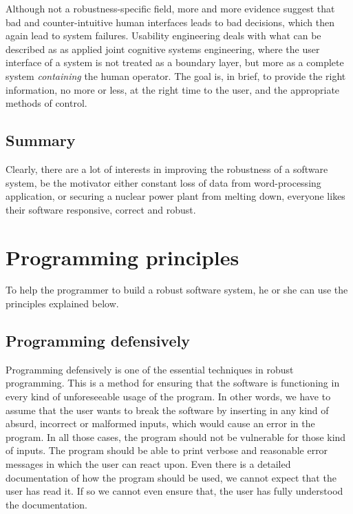 \documentclass[10pt,a4paper]{article}
\begin{document}
Although not a robustness-specific field, more and more evidence suggest that bad and counter-intuitive human interfaces leads to bad decisions, which then again lead to system failures.
Usability engineering deals with what can be described as as applied joint cognitive systems\cite{hollnagel2005joint} engineering, where the user interface of a system is not treated as a boundary layer, but more as a complete system \emph{containing} the human operator.
The goal is, in brief, to provide the right information, no more or less, at the right time to the user, and the appropriate methods of control.

\subsection{Summary}
Clearly, there are a lot of interests in improving the robustness of a software system, be the motivator either constant loss of data from word-processing application, or securing a nuclear power plant from melting down, everyone likes their software responsive, correct and robust.

\section{Programming principles}
\label{sec:programming_principles}

To help the programmer to build a robust software system, he or she can use the principles explained below.

\subsection{Programming defensively}

Programming defensively is one of the essential techniques in robust programming.
This is a method for ensuring that the software is functioning in every kind of unforeseeable usage of the program. In other words, we have to assume that the user wants to break the software by inserting in any kind of absurd, incorrect or malformed inputs, which would cause an error in the program. In all those cases, the program should not be vulnerable for those kind of inputs. The program should be able to print verbose and reasonable error messages in which the user can react upon.
Even there is a detailed documentation of how the program should be used, we cannot expect that the user has read it. If so we cannot even ensure that, the user has fully understood the documentation.\\
\end{document}
